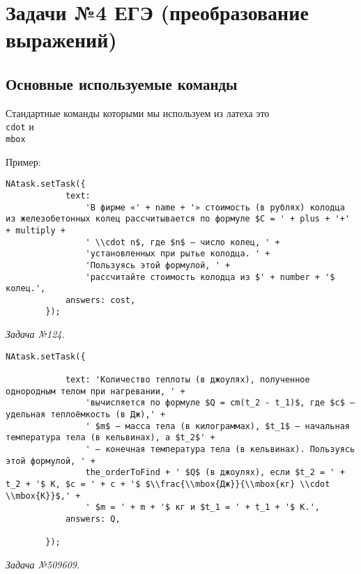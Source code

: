 \section{Задачи №4 ЕГЭ (преобразование выражений)}

\subsection{Основные используемые команды}

Стандартные команды которыми мы используем из латеха это \texttt{\\cdot} и \texttt{\\mbox}

Пример:
\begin{lstlisting}
NAtask.setTask({
			text:
				'В фирме «' + name + '» стоимость (в рублях) колодца из железобетонных колец рассчитывается по формуле $C = ' + plus + '+' + multiply + 
				' \\cdot n$, где $n$ – число колец, ' +
				'установленных при рытье колодца. ' +
				'Пользуясь этой формулой, ' +
				'рассчитайте стоимость колодца из $' + number + '$ колец.',
			answers: cost,
		});
\end{lstlisting}
\textsl{Задача №124.}

\begin{lstlisting}
NAtask.setTask({

			text: 'Количество теплоты (в джоулях), полученное однородным телом при нагревании, ' +
				'вычисляется по формуле $Q = cm(t_2 - t_1)$, где $c$ – удельная теплоёмкость (в Дж),' +
				' $m$ – масса тела (в килограммах), $t_1$ – начальная температура тела (в кельвинах), а $t_2$' +
				' – конечная температура тела (в кельвинах). Пользуясь этой формулой, ' +
				the_orderToFind + ' $Q$ (в джоулях), если $t_2 = ' + t_2 + '$ К, $c = ' + c + '$ $\\frac{\\mbox{Дж}}{\\mbox{кг} \\cdot \\mbox{К}}$,' +
				' $m = ' + m + '$ кг и $t_1 = ' + t_1 + '$ К.',
			answers: Q,

		});
\end{lstlisting}
\textsl{Задача №509609.}

